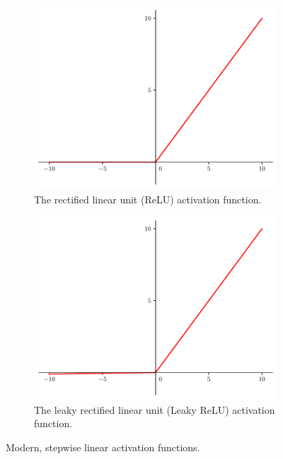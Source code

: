 \begin{figure}
    \centering
    \begin{subfigure}[b]{0.45\textwidth}
        \includegraphics[width=\textwidth]{relu.pdf}
        \caption{The rectified linear unit (ReLU) activation function.}
        \label{fig:relu}
    \end{subfigure}
    \hfill
    \begin{subfigure}[b]{0.45\textwidth}
        \includegraphics[width=\textwidth]{leaky_relu.pdf}
        \caption{The leaky rectified linear unit (Leaky ReLU) activation function.}
        \label{fig:leaky-relu}
    \end{subfigure}
    
    \caption{Modern, stepwise linear activation functions.}
    \label{fig:subfigures}
\end{figure}


